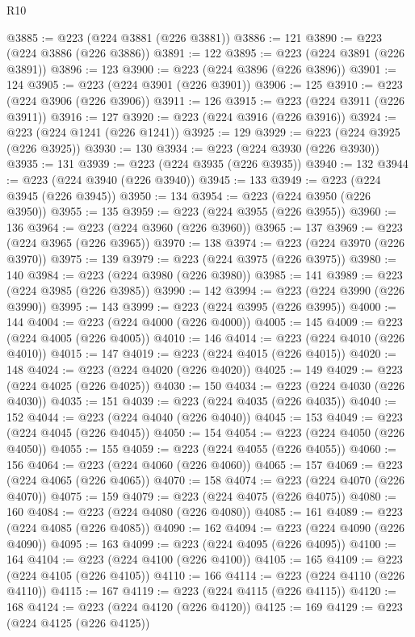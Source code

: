 \begin{lexlean}{R10}
\begin{coremodule}
@3885 := @223 (@224 @3881 (@226 @3881))
@3886 := 121
@3890 := @223 (@224 @3886 (@226 @3886))
@3891 := 122
@3895 := @223 (@224 @3891 (@226 @3891))
@3896 := 123
@3900 := @223 (@224 @3896 (@226 @3896))
@3901 := 124
@3905 := @223 (@224 @3901 (@226 @3901))
@3906 := 125
@3910 := @223 (@224 @3906 (@226 @3906))
@3911 := 126
@3915 := @223 (@224 @3911 (@226 @3911))
@3916 := 127
@3920 := @223 (@224 @3916 (@226 @3916))
@3924 := @223 (@224 @1241 (@226 @1241))
@3925 := 129
@3929 := @223 (@224 @3925 (@226 @3925))
@3930 := 130
@3934 := @223 (@224 @3930 (@226 @3930))
@3935 := 131
@3939 := @223 (@224 @3935 (@226 @3935))
@3940 := 132
@3944 := @223 (@224 @3940 (@226 @3940))
@3945 := 133
@3949 := @223 (@224 @3945 (@226 @3945))
@3950 := 134
@3954 := @223 (@224 @3950 (@226 @3950))
@3955 := 135
@3959 := @223 (@224 @3955 (@226 @3955))
@3960 := 136
@3964 := @223 (@224 @3960 (@226 @3960))
@3965 := 137
@3969 := @223 (@224 @3965 (@226 @3965))
@3970 := 138
@3974 := @223 (@224 @3970 (@226 @3970))
@3975 := 139
@3979 := @223 (@224 @3975 (@226 @3975))
@3980 := 140
@3984 := @223 (@224 @3980 (@226 @3980))
@3985 := 141
@3989 := @223 (@224 @3985 (@226 @3985))
@3990 := 142
@3994 := @223 (@224 @3990 (@226 @3990))
@3995 := 143
@3999 := @223 (@224 @3995 (@226 @3995))
@4000 := 144
@4004 := @223 (@224 @4000 (@226 @4000))
@4005 := 145
@4009 := @223 (@224 @4005 (@226 @4005))
@4010 := 146
@4014 := @223 (@224 @4010 (@226 @4010))
@4015 := 147
@4019 := @223 (@224 @4015 (@226 @4015))
@4020 := 148
@4024 := @223 (@224 @4020 (@226 @4020))
@4025 := 149
@4029 := @223 (@224 @4025 (@226 @4025))
@4030 := 150
@4034 := @223 (@224 @4030 (@226 @4030))
@4035 := 151
@4039 := @223 (@224 @4035 (@226 @4035))
@4040 := 152
@4044 := @223 (@224 @4040 (@226 @4040))
@4045 := 153
@4049 := @223 (@224 @4045 (@226 @4045))
@4050 := 154
@4054 := @223 (@224 @4050 (@226 @4050))
@4055 := 155
@4059 := @223 (@224 @4055 (@226 @4055))
@4060 := 156
@4064 := @223 (@224 @4060 (@226 @4060))
@4065 := 157
@4069 := @223 (@224 @4065 (@226 @4065))
@4070 := 158
@4074 := @223 (@224 @4070 (@226 @4070))
@4075 := 159
@4079 := @223 (@224 @4075 (@226 @4075))
@4080 := 160
@4084 := @223 (@224 @4080 (@226 @4080))
@4085 := 161
@4089 := @223 (@224 @4085 (@226 @4085))
@4090 := 162
@4094 := @223 (@224 @4090 (@226 @4090))
@4095 := 163
@4099 := @223 (@224 @4095 (@226 @4095))
@4100 := 164
@4104 := @223 (@224 @4100 (@226 @4100))
@4105 := 165
@4109 := @223 (@224 @4105 (@226 @4105))
@4110 := 166
@4114 := @223 (@224 @4110 (@226 @4110))
@4115 := 167
@4119 := @223 (@224 @4115 (@226 @4115))
@4120 := 168
@4124 := @223 (@224 @4120 (@226 @4120))
@4125 := 169
@4129 := @223 (@224 @4125 (@226 @4125))

\end{coremodule}
\end{lexlean}
